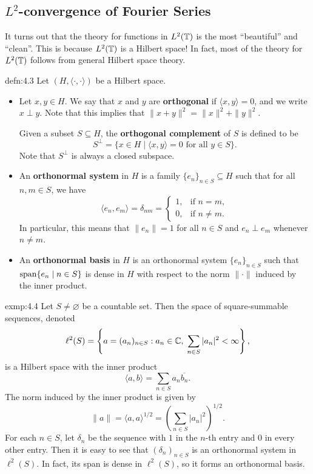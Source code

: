 \subsection{$L^2$-convergence of Fourier Series} \label{subsec:4.2}
It turns out that the theory for functions in $L^2(\mathbb{T})$ is the most 
``beautiful'' and ``clean''. This is because $L^2(\mathbb{T})$ is a Hilbert space! 
In fact, most of the theory for $L^2(\mathbb{T})$ follows from general Hilbert 
space theory. 

\begin{defn}{defn:4.3}
    Let $(H, \langle \cdot, \cdot \rangle)$ be a Hilbert space. 
    \begin{itemize}
        \item Let $x, y \in H$. We say that $x$ and $y$ are {\bf orthogonal}
        if $\langle x, y \rangle = 0$, and we write $x \perp y$. 
        Note that this implies that $\|x + y\|^2 = \|x\|^2 + \|y\|^2$.

        Given a subset $S \subseteq H$, the {\bf orthogonal complement} of $S$ 
        is defined to be 
        \[ S^\perp = \{x \in H \mid \langle x, y \rangle = 0 \text{ for all }
        y \in S\}. \] 
        Note that $S^\perp$ is always a closed subspace. 

        \item An {\bf orthonormal system} in $H$ is a family $\{e_n\}_{n\in S} 
        \subseteq H$ such that for all $n, m \in S$, we have 
        \[ \langle e_n, e_m \rangle = \delta_{nm} = \begin{cases} 
            1, & \text{if } n = m, \\ 
            0, & \text{if } n \neq m. 
        \end{cases} \] 
        In particular, this means that $\|e_n\| = 1$ for all $n \in S$ 
        and $e_n \perp e_m$ whenever $n \neq m$. 

        \item An {\bf orthonormal basis} in $H$ is an orthonormal system 
        $\{e_n\}_{n\in S}$ such that $\operatorname{span}\{e_n \mid n \in S\}$ is 
        dense in $H$ with respect to the norm $\|\cdot\|$ induced by the 
        inner product. 
    \end{itemize}
\end{defn}

\begin{exmp}{exmp:4.4}
    Let $S \neq \varnothing$ be a countable set. Then the space of 
    square-summable sequences, denoted 
    \[ \ell^2(S) = \left\{ a = (a_n)_{n\in S} : a_n \in \mathbb{C},\; 
    \sum_{n\in S} |a_n|^2 < \infty \right\}, \] 
    is a Hilbert space with the inner product 
    \[ \langle a, b \rangle = \sum_{n\in S} a_n \overline{b_n}. \] 
    The norm induced by the inner product is given by 
    \[ \|a\| = \langle a, a \rangle^{1/2} = \left( \sum_{n\in S} |a_n|^2 
    \right)^{\!1/2}. \] 
    For each $n \in S$, let $\delta_n$ be the sequence with 
    $1$ in the $n$-th entry and $0$ in every other entry. Then 
    it is easy to see that $(\delta_n)_{n\in S}$ is an orthonormal 
    system in $\ell^2(S)$. In fact, its span is dense in $\ell^2(S)$, 
    so it forms an orthonormal basis. 
\end{exmp}

